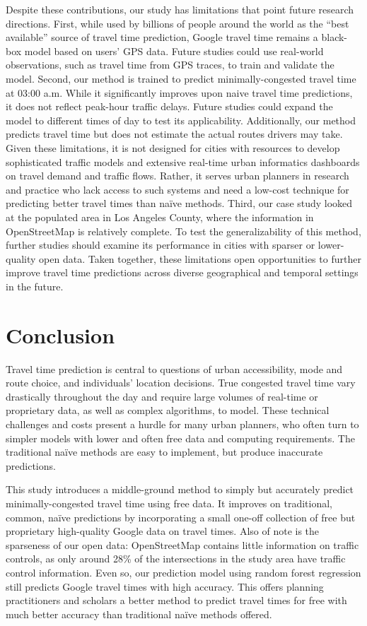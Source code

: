 \documentclass[12pt,letterpaper]{article} %
\begin{document}
    Despite these contributions, our study has limitations that point future research directions. First, while used by billions of people around the world as the \enquote{best available} source of travel time prediction, Google travel time remains a black-box model based on users' GPS data. Future studies could use real-world observations, such as travel time from GPS traces, to train and validate the model. Second, our method is trained to predict minimally-congested travel time at 03:00 a.m. While it significantly improves upon naive travel time predictions, it does not reflect peak-hour traffic delays. Future studies could expand the model to different times of day to test its applicability. Additionally, our method predicts travel time but does not estimate the actual routes drivers may take. Given these limitations, it is not designed for cities with resources to develop sophisticated traffic models and extensive real-time urban informatics dashboards on travel demand and traffic flows. Rather, it serves urban planners in research and practice who lack access to such systems and need a low-cost technique for predicting better travel times than naïve methods. Third, our case study looked at the populated area in Los Angeles County, where the information in OpenStreetMap is relatively complete. To test the generalizability of this method, further studies should examine its performance in cities with sparser or lower-quality open data. Taken together, these limitations open opportunities to further improve travel time predictions across diverse geographical and temporal settings in the future.

    \section{Conclusion}

    Travel time prediction is central to questions of urban accessibility, mode and route choice, and individuals’ location decisions. True congested travel time vary drastically throughout the day and require large volumes of real-time or proprietary data, as well as complex algorithms, to model. These technical challenges and costs present a hurdle for many urban planners, who often turn to simpler models with lower and often free data and computing requirements. The traditional naïve methods are easy to implement, but produce inaccurate predictions.

    This study introduces a middle-ground method to simply but accurately predict minimally-congested travel time using free data. It improves on traditional, common, naïve predictions by incorporating a small one-off collection of free but proprietary high-quality Google data on travel times. Also of note is the sparseness of our open data: OpenStreetMap contains little information on traffic controls, as only around 28\% of the intersections in the study area have traffic control information. Even so, our prediction model using random forest regression still predicts Google travel times with high accuracy. This offers planning practitioners and scholars a better method to predict travel times for free with much better accuracy than traditional naïve methods offered.
\end{document}
